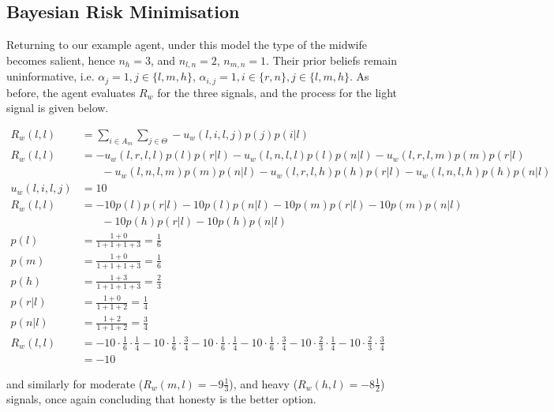 \subsection{Bayesian Risk Minimisation}
\label{sub:bayes_eg}

Returning to our example agent, under this model the type of the midwife becomes salient, hence \(n_{h}=3\), and \(n_{l,n}=2\), \(n_{m,n}=1\). Their prior beliefs remain uninformative, i.e. \(\alpha_{j} = 1, j \in \{l,m,h\}\), \(\alpha_{i,j}=1,i \in \{r,n\}, j \in \{l,m,h\}\). As before, the agent evaluates \(R_{w}\) for the three signals, and the process for the light signal is given below.

\begin{equation*}
\begin{aligned}
R_{w}(l, l) &= \sum_{i\in A_{m}}\sum_{j\in \Theta} -u_{w}(l, i, l, j)p(j)p(i | l)\\
R_{w}(l, l) &= -u_{w}(l, r, l, l)p(l)p(r | l) - u_{w}(l, n, l, l)p(l)p(n | l) - u_{w}(l, r, l, m)p(m)p(r | l)\\
&\phantom{{}=1}- u_{w}(l, n, l, m)p(m)p(n | l) - u_{w}(l, r, l, h)p(h)p(r | l) - u_{w}(l, n, l, h)p(h)p(n | l)\\
u_{w}(l, i, l, j) &= 10\\
R_{w}(l, l) &= -10p(l)p(r | l) - 10p(l)p(n | l) - 10p(m)p(r | l) - 10p(m)p(n | l)\\
&\phantom{{}=1} - 10p(h)p(r | l) - 10p(h)p(n | l)\\
p(l) &= \frac{1 + 0}{1 + 1 + 1 + 3} = \frac{1}{6}\\
p(m) &= \frac{1 + 0}{1 + 1 + 1 + 3} = \frac{1}{6}\\
p(h) &= \frac{1 + 3}{1 + 1 + 1 + 3} = \frac{2}{3}\\
p(r | l) &= \frac{1 + 0}{1 + 1 + 2} = \frac{1}{4}\\
p(n | l) &= \frac{1 + 2}{1 + 1 + 2} = \frac{3}{4}\\
R_{w}(l, l) &= -10\cdot \frac{1}{6} \cdot \frac{1}{4} - 10\cdot \frac{1}{6} \cdot \frac{3}{4} - 10\cdot \frac{1}{6} \cdot \frac{1}{4} - 10\cdot \frac{1}{6} \cdot \frac{3}{4} - 10\cdot \frac{2}{3} \cdot \frac{1}{4} - 10\cdot \frac{2}{3} \cdot \frac{3}{4}\\
&= -10
\end{aligned}
\end{equation*}

and similarly for moderate (\(R_{w}(m,l)=-9\frac{1}{3}\)), and heavy (\(R_{w}(h,l)=-8\frac{1}{2}\)) signals, once again concluding that honesty is the better option.

